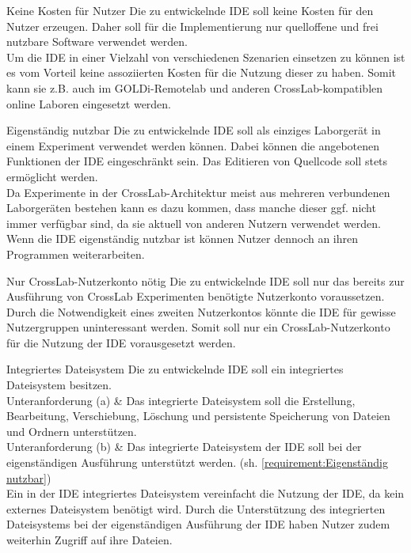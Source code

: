 \begin{requirement}{Keine Kosten für Nutzer}
    \reqdescription Die zu entwickelnde IDE soll keine Kosten für den Nutzer erzeugen. Daher soll für die Implementierung nur quelloffene und frei nutzbare Software verwendet werden.  \\
    \reqrationale Um die IDE in einer Vielzahl von verschiedenen Szenarien einsetzen zu können ist es vom Vorteil keine assoziierten Kosten für die Nutzung dieser zu haben. Somit kann sie z.B. auch im GOLDi-Remotelab und anderen CrossLab-kompatiblen online Laboren eingesetzt werden. \\
\end{requirement}

\begin{requirement}{Eigenständig nutzbar}
    \reqdescription Die zu entwickelnde IDE soll als einziges Laborgerät in einem Experiment verwendet werden können. Dabei können die angebotenen Funktionen der IDE eingeschränkt sein. Das Editieren von Quellcode soll stets ermöglicht werden. \\
    \reqrationale Da Experimente in der CrossLab-Architektur meist aus mehreren verbundenen Laborgeräten bestehen kann es dazu kommen, dass manche dieser ggf. nicht immer verfügbar sind, da sie aktuell von anderen Nutzern verwendet werden. Wenn die IDE eigenständig nutzbar ist können Nutzer dennoch an ihren Programmen weiterarbeiten. \\
\end{requirement}

\begin{requirement}{Nur CrossLab-Nutzerkonto nötig}
    \reqdescription Die zu entwickelnde IDE soll nur das bereits zur Ausführung von CrossLab Experimenten benötigte Nutzerkonto voraussetzen. \\
    \reqrationale Durch die Notwendigkeit eines zweiten Nutzerkontos könnte die IDE für gewisse Nutzergruppen uninteressant werden. Somit soll nur ein CrossLab-Nutzerkonto für die Nutzung der IDE vorausgesetzt werden. \\
\end{requirement}

\begin{requirement}{Integriertes Dateisystem}
    \reqdescription Die zu entwickelnde IDE soll ein integriertes Dateisystem besitzen. \\
    Unteranforderung (a) & Das integrierte Dateisystem soll die Erstellung, Bearbeitung, Verschiebung, Löschung und persistente Speicherung von Dateien und Ordnern unterstützen. \\
    Unteranforderung (b) & Das integrierte Dateisystem der IDE soll bei der eigenständigen Ausführung unterstützt werden. (sh. \autoref{requirement:Eigenständig nutzbar}) \\
    \reqrationale Ein in der IDE integriertes Dateisystem vereinfacht die Nutzung der IDE, da kein externes Dateisystem benötigt wird. Durch die Unterstützung des integrierten Dateisystems bei der eigenständigen Ausführung der IDE haben Nutzer zudem weiterhin Zugriff auf ihre Dateien. \\
\end{requirement}

